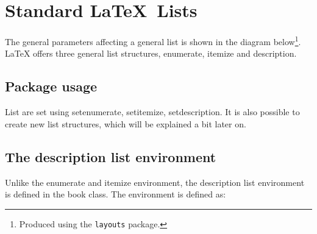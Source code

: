 \begingroup

\makeatletter
%
%

\chapter{Standard \LaTeX\ Lists}


The general parameters affecting a general list is shown in the  diagram  below\footnote{Produced using the \texttt{layouts} package.}. LaTeX offers three general list structures, enumerate, itemize and description.

\section{Package usage}

List are set using setenumerate, setitemize, setdescription. It is also possible to create new list structures, which will be explained a bit later on.


\section{The description list environment}
Unlike the enumerate and itemize environment, the description list environment is defined in the book class.
The environment is defined as:

